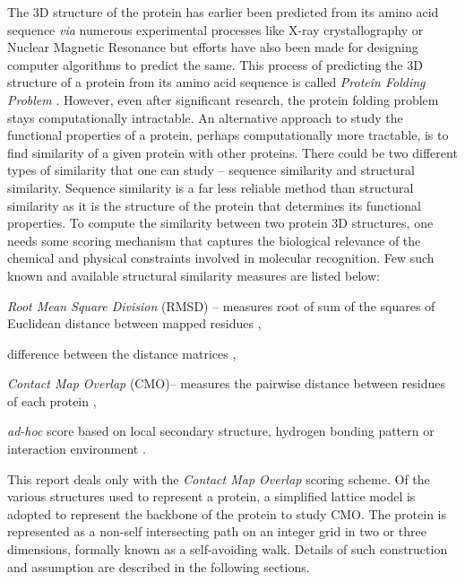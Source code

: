 The 3D structure of the protein has earlier been predicted from its amino acid sequence \emph{via} numerous experimental processes like X-ray crystallography \citep{anca08} or Nuclear Magnetic Resonance \cite{walc13} but efforts have also been made for designing computer algorithms to predict the same. This process of predicting the 3D structure of a protein from its amino acid sequence is called {\it Protein Folding Problem} \citep{bele98,crgp98,dima12}. However, even after significant research, the protein folding problem stays computationally intractable.
An alternative approach to study the functional properties of a protein, perhaps computationally more tractable, is to find similarity of a given protein with other proteins.
There could be two different types of similarity that one can study -- sequence similarity and structural similarity. Sequence similarity is a far less reliable method than structural similarity as it is the structure of the protein that determines its functional properties. To compute the similarity between two protein 3D structures, one needs some scoring mechanism that captures the biological relevance of the chemical and physical constraints involved in molecular recognition. Few such known and available structural similarity measures are listed below:
\begin{noindlist}
\item {\it Root Mean Square Division} (RMSD) -- measures root of sum of the squares of Euclidean distance between mapped residues \citep{cost80,diamond88,diamond92},
\item difference between the distance matrices \citep{hosa93,hosa96,huph04},
\item {\it Contact Map Overlap} (CMO)-- measures the pairwise distance between residues of each protein \citep{goip99,agmw07,anmy11},
\item \emph{ad-hoc} score based on local secondary structure, hydrogen bonding pattern or interaction environment \citep{bljo93,vrsa91,taor89,zuso89}.
\end{noindlist}

This report deals only with the {\it Contact Map Overlap} scoring scheme.
Of the various structures used to represent a protein, a simplified lattice model is adopted to
represent the backbone of the protein to study CMO.
The protein is represented as a non-self intersecting path on an integer grid in two or three dimensions, formally known as a self-avoiding walk. Details of such construction and assumption are described in the following sections.

